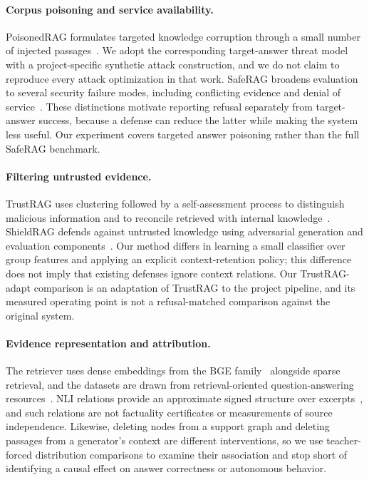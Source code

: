 \documentclass[sigconf]{aamas}
\begin{document}
\paragraph{Corpus poisoning and service availability.}
PoisonedRAG formulates targeted knowledge corruption through a small number of injected passages~\cite{poisonedrag}. We adopt the corresponding target-answer threat model with a project-specific synthetic attack construction, and we do not claim to reproduce every attack optimization in that work. SafeRAG broadens evaluation to several security failure modes, including conflicting evidence and denial of service~\cite{saferag}. These distinctions motivate reporting refusal separately from target-answer success, because a defense can reduce the latter while making the system less useful. Our experiment covers targeted answer poisoning rather than the full SafeRAG benchmark.

\paragraph{Filtering untrusted evidence.}
TrustRAG uses clustering followed by a self-assessment process to distinguish malicious information and to reconcile retrieved with internal knowledge~\cite{trustrag}. ShieldRAG defends against untrusted knowledge using adversarial generation and evaluation components~\cite{shieldrag}. Our method differs in learning a small classifier over group features and applying an explicit context-retention policy; this difference does not imply that existing defenses ignore context relations. Our TrustRAG-adapt comparison is an adaptation of TrustRAG to the project pipeline, and its measured operating point is not a refusal-matched comparison against the original system.

\paragraph{Evidence representation and attribution.}
The retriever uses dense embeddings from the BGE family~\cite{bge} alongside sparse retrieval, and the datasets are drawn from retrieval-oriented question-answering resources~\cite{beir}. NLI relations provide an approximate signed structure over excerpts~\cite{nlimodel}, and such relations are not factuality certificates or measurements of source independence. Likewise, deleting nodes from a support graph and deleting passages from a generator's context are different interventions, so we use teacher-forced distribution comparisons to examine their association and stop short of identifying a causal effect on answer correctness or autonomous behavior.
\end{document}

